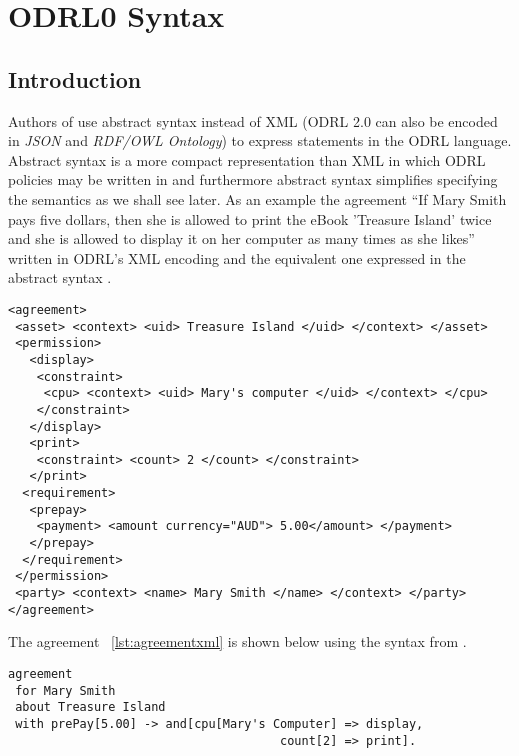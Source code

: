\chapter{ODRL0 Syntax}

\section{Introduction}

Authors of \cite{pucella2006} use abstract syntax instead of XML (ODRL 2.0 can also be encoded in \emph{JSON} and \emph{RDF/OWL Ontology}) to express statements in the ODRL language. Abstract syntax is a more compact representation than XML in which ODRL policies may be written in and furthermore abstract syntax simplifies specifying the semantics as we shall see later. As an example the agreement ``If Mary Smith pays five dollars, then she is allowed to print the eBook 'Treasure Island' twice and she is allowed to display it on her computer as many times as she likes'' written in ODRL's XML encoding and the equivalent one expressed in the abstract syntax \cite{pucella2006}.

\lstset{language=XML}
\begin{lstlisting}[caption={agreement for Mary Smith in XML},label={lst:agreementxml}]
<agreement>
 <asset> <context> <uid> Treasure Island </uid> </context> </asset>
 <permission>
   <display>
    <constraint>
     <cpu> <context> <uid> Mary's computer </uid> </context> </cpu>
    </constraint>
   </display>
   <print>
    <constraint> <count> 2 </count> </constraint>
   </print>
  <requirement>
   <prepay>
    <payment> <amount currency="AUD"> 5.00</amount> </payment>
   </prepay>
  </requirement>
 </permission>
 <party> <context> <name> Mary Smith </name> </context> </party>
</agreement>
\end{lstlisting}

The agreement ~\ref{lst:agreementxml} is shown below using the syntax from \cite{pucella2006}.

\lstset{language=Pucella2006}
\begin{minipage}[c]{0.95\textwidth}
\begin{lstlisting}[frame=single, caption={agreement for Mary Smith as BNF (as used in ~\cite{pucella2006})},label={lst:agreementpucella2006}]
agreement
 for Mary Smith 
 about Treasure Island 
 with prePay[5.00] -> and[cpu[Mary's Computer] => display,
                                      count[2] => print].
\end{lstlisting}
\end{minipage} 


